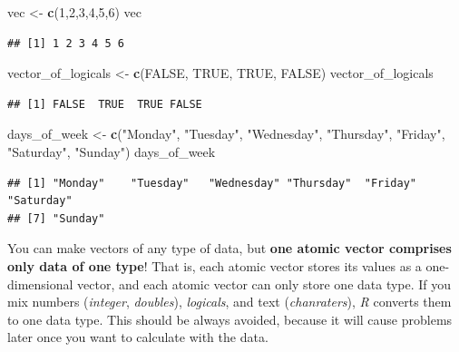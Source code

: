 \documentclass[
]{scrartcl}
\newenvironment{Shaded}{\begin{snugshade}}{\end{snugshade}}
\newcommand{\ConstantTok}[1]{\textcolor[rgb]{0.56,0.35,0.01}{#1}}
\newcommand{\DecValTok}[1]{\textcolor[rgb]{0.00,0.00,0.81}{#1}}
\newcommand{\FunctionTok}[1]{\textcolor[rgb]{0.13,0.29,0.53}{\textbf{#1}}}
\newcommand{\NormalTok}[1]{#1}
\newcommand{\OtherTok}[1]{\textcolor[rgb]{0.56,0.35,0.01}{#1}}
\newcommand{\StringTok}[1]{\textcolor[rgb]{0.31,0.60,0.02}{#1}}
\begin{document}
\begin{Shaded}
\begin{Highlighting}[]
\NormalTok{vec }\OtherTok{\textless{}{-}} \FunctionTok{c}\NormalTok{(}\DecValTok{1}\NormalTok{,}\DecValTok{2}\NormalTok{,}\DecValTok{3}\NormalTok{,}\DecValTok{4}\NormalTok{,}\DecValTok{5}\NormalTok{,}\DecValTok{6}\NormalTok{)}
\NormalTok{vec}
\end{Highlighting}
\end{Shaded}

\begin{verbatim}
## [1] 1 2 3 4 5 6
\end{verbatim}

\begin{Shaded}
\begin{Highlighting}[]
\NormalTok{vector\_of\_logicals  }\OtherTok{\textless{}{-}} \FunctionTok{c}\NormalTok{(}\ConstantTok{FALSE}\NormalTok{, }\ConstantTok{TRUE}\NormalTok{, }\ConstantTok{TRUE}\NormalTok{, }\ConstantTok{FALSE}\NormalTok{)}
\NormalTok{vector\_of\_logicals}
\end{Highlighting}
\end{Shaded}

\begin{verbatim}
## [1] FALSE  TRUE  TRUE FALSE
\end{verbatim}

\begin{Shaded}
\begin{Highlighting}[]
\NormalTok{days\_of\_week }\OtherTok{\textless{}{-}} \FunctionTok{c}\NormalTok{(}\StringTok{"Monday"}\NormalTok{, }\StringTok{"Tuesday"}\NormalTok{, }\StringTok{"Wednesday"}\NormalTok{, }\StringTok{"Thursday"}\NormalTok{, }\StringTok{"Friday"}\NormalTok{,}
                \StringTok{"Saturday"}\NormalTok{, }\StringTok{"Sunday"}\NormalTok{)}
\NormalTok{days\_of\_week}
\end{Highlighting}
\end{Shaded}

\begin{verbatim}
## [1] "Monday"    "Tuesday"   "Wednesday" "Thursday"  "Friday"    "Saturday" 
## [7] "Sunday"
\end{verbatim}

You can make vectors of any type of data, but \textbf{one atomic vector comprises only data of one type}! That is, each atomic vector stores its values as a one-dimensional vector, and each atomic vector can only store one data type. If you mix numbers (\emph{integer}, \emph{doubles}), \emph{logicals}, and text (\emph{chanraters}), \emph{R} converts them to one data type. This should be always avoided, because it will cause problems later once you want to calculate with the data.
\end{document}
